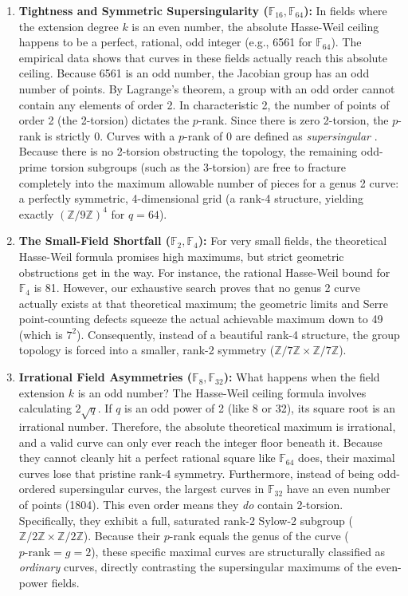 \documentclass[11pt,letterpaper]{article}
\begin{document}
	\begin{enumerate}
		\item \textbf{Tightness and Symmetric Supersingularity ($\mathbb{F}_{16}, \mathbb{F}_{64}$):} In fields where the extension degree $k$ is an even number, the absolute Hasse-Weil ceiling happens to be a perfect, rational, odd integer (e.g., 6561 for $\mathbb{F}_{64}$). The empirical data shows that curves in these fields actually reach this absolute ceiling. Because 6561 is an odd number, the Jacobian group has an odd number of points. By Lagrange's theorem, a group with an odd order cannot contain any elements of order 2. In characteristic 2, the number of points of order 2 (the 2-torsion) dictates the $p$-rank. Since there is zero 2-torsion, the $p$-rank is strictly 0. Curves with a $p$-rank of 0 are defined as \textit{supersingular} \cite{Scholten2002}. Because there is no 2-torsion obstructing the topology, the remaining odd-prime torsion subgroups (such as the 3-torsion) are free to fracture completely into the maximum allowable number of pieces for a genus 2 curve: a perfectly symmetric, 4-dimensional grid (a rank-4 structure, yielding exactly $(\mathbb{Z}/9\mathbb{Z})^4$ for $q=64$).
		
		\item \textbf{The Small-Field Shortfall ($\mathbb{F}_2, \mathbb{F}_4$):} For very small fields, the theoretical Hasse-Weil formula promises high maximums, but strict geometric obstructions get in the way. For instance, the rational Hasse-Weil bound for $\mathbb{F}_4$ is 81. However, our exhaustive search proves that no genus 2 curve actually exists at that theoretical maximum; the geometric limits and Serre point-counting defects squeeze the actual achievable maximum down to 49 (which is $7^2$). Consequently, instead of a beautiful rank-4 structure, the group topology is forced into a smaller, rank-2 symmetry ($\mathbb{Z}/7\mathbb{Z} \times \mathbb{Z}/7\mathbb{Z}$).
		
		\item \textbf{Irrational Field Asymmetries ($\mathbb{F}_8, \mathbb{F}_{32}$):} What happens when the field extension $k$ is an odd number? The Hasse-Weil ceiling formula involves calculating $2\sqrt{q}$. If $q$ is an odd power of 2 (like 8 or 32), its square root is an irrational number. Therefore, the absolute theoretical maximum is irrational, and a valid curve can only ever reach the integer floor beneath it. Because they cannot cleanly hit a perfect rational square like $\mathbb{F}_{64}$ does, their maximal curves lose that pristine rank-4 symmetry. Furthermore, instead of being odd-ordered supersingular curves, the largest curves in $\mathbb{F}_{32}$ have an even number of points (1804). This even order means they \textit{do} contain 2-torsion. Specifically, they exhibit a full, saturated rank-2 Sylow-2 subgroup ($\mathbb{Z}/2\mathbb{Z} \times \mathbb{Z}/2\mathbb{Z}$). Because their $p$-rank equals the genus of the curve ($p\text{-rank} = g = 2$), these specific maximal curves are structurally classified as \textit{ordinary} curves, directly contrasting the supersingular maximums of the even-power fields.
	\end{enumerate}
	
\end{document}
